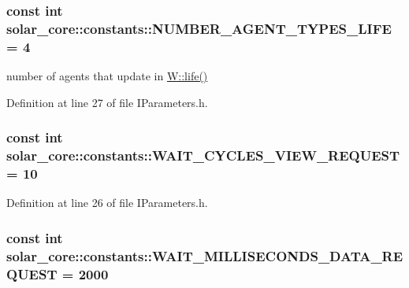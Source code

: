 \subsubsection[{N\+U\+M\+B\+E\+R\+\_\+\+A\+G\+E\+N\+T\+\_\+\+T\+Y\+P\+E\+S\+\_\+\+L\+I\+F\+E}]{\setlength{\rightskip}{0pt plus 5cm}const int solar\+\_\+core\+::constants\+::\+N\+U\+M\+B\+E\+R\+\_\+\+A\+G\+E\+N\+T\+\_\+\+T\+Y\+P\+E\+S\+\_\+\+L\+I\+F\+E = 4}\label{namespacesolar__core_1_1constants_a2ec52da705235aa418b0def4e509ef81}
number of agents that update in \hyperlink{classsolar__core_1_1_w_a5e64e5a7ef41c07fddf7994cd3f2693e}{W\+::life()} 

Definition at line 27 of file I\+Parameters.\+h.

\hypertarget{namespacesolar__core_1_1constants_ae4d0a481c94f57be3e97f1c8463e631a}{}
\subsubsection[{W\+A\+I\+T\+\_\+\+C\+Y\+C\+L\+E\+S\+\_\+\+V\+I\+E\+W\+\_\+\+R\+E\+Q\+U\+E\+S\+T}]{\setlength{\rightskip}{0pt plus 5cm}const int solar\+\_\+core\+::constants\+::\+W\+A\+I\+T\+\_\+\+C\+Y\+C\+L\+E\+S\+\_\+\+V\+I\+E\+W\+\_\+\+R\+E\+Q\+U\+E\+S\+T = 10}\label{namespacesolar__core_1_1constants_ae4d0a481c94f57be3e97f1c8463e631a}


Definition at line 26 of file I\+Parameters.\+h.

\hypertarget{namespacesolar__core_1_1constants_a88d556c323e6871de3313428289b6cb6}{}
\subsubsection[{W\+A\+I\+T\+\_\+\+M\+I\+L\+L\+I\+S\+E\+C\+O\+N\+D\+S\+\_\+\+D\+A\+T\+A\+\_\+\+R\+E\+Q\+U\+E\+S\+T}]{\setlength{\rightskip}{0pt plus 5cm}const int solar\+\_\+core\+::constants\+::\+W\+A\+I\+T\+\_\+\+M\+I\+L\+L\+I\+S\+E\+C\+O\+N\+D\+S\+\_\+\+D\+A\+T\+A\+\_\+\+R\+E\+Q\+U\+E\+S\+T = 2000}\label{namespacesolar__core_1_1constants_a88d556c323e6871de3313428289b6cb6}


